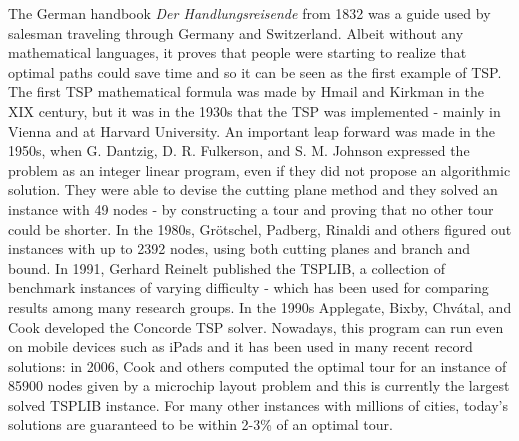 The German handbook \textit{Der Handlungsreisende} from 1832 was a guide
used by salesman traveling through Germany and Switzerland. Albeit
without any mathematical languages, it proves that people were starting to realize that optimal paths could save time and so it can be seen as the first example of TSP.
The first TSP mathematical formula was made by Hmail and Kirkman in the XIX century, but it was in the 1930s that the TSP was implemented -
mainly in Vienna and at Harvard University. An important leap forward
was made in the 1950s, when G. Dantzig, D. R. Fulkerson, and S. M.
Johnson expressed the problem as an integer linear program, even if they  did not propose an algorithmic solution. They were able to devise the cutting plane method and they solved an instance with 49 nodes - by constructing a tour and proving that no other tour could be shorter.
In the 1980s, Grötschel, Padberg, Rinaldi and others figured out instances with up to 2392 nodes, using both cutting planes and branch and bound. In 1991, Gerhard Reinelt published the TSPLIB, a collection of benchmark instances of varying difficulty - which has been used for comparing results among many research groups. In the 1990s Applegate, Bixby, Chvátal, and Cook developed the Concorde TSP solver. Nowadays, this program can run even on mobile devices such as iPads and it has been used in many recent record solutions: in 2006, Cook and others computed the optimal tour for an instance of 85900 nodes given by a microchip layout problem and this is currently the largest solved TSPLIB instance. For many other instances with millions of cities, today’s solutions are guaranteed to be within 2-3\% of an optimal tour.